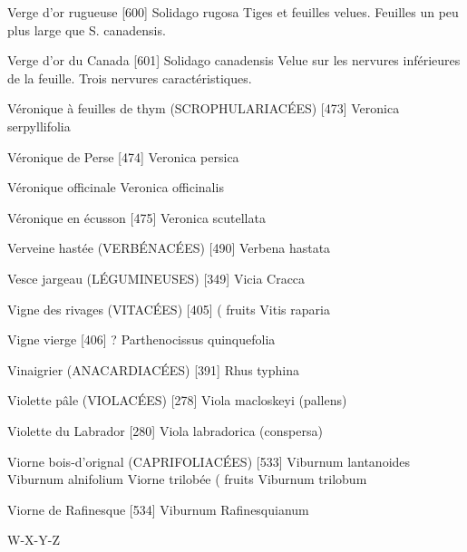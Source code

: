 \documentclass[book,12pt,a4paper,onecolumn,openany]{memoir}
\begin{document}
Verge d’or rugueuse  [600]
				Solidago rugosa
Tiges et feuilles velues. Feuilles un peu plus large que S. canadensis.

Verge d’or du Canada  [601]
				Solidago canadensis
Velue sur les nervures inférieures de la feuille. Trois nervures caractéristiques.

Véronique à feuilles de thym (SCROPHULARIACÉES)  [473]
				Veronica serpyllifolia

Véronique de Perse  [474]
				Veronica persica

Véronique officinale
				Veronica officinalis

Véronique en écusson  [475]
				Veronica scutellata


Verveine hastée (VERBÉNACÉES)  [490]
				Verbena hastata

Vesce jargeau (LÉGUMINEUSES)  [349]
				Vicia Cracca

Vigne des rivages (VITACÉES)  [405]				( fruits
				Vitis raparia

Vigne vierge  [406]							?
				Parthenocissus quinquefolia

Vinaigrier (ANACARDIACÉES)  [391]
				Rhus typhina

Violette pâle (VIOLACÉES)  [278]
				Viola macloskeyi (pallens)

Violette du Labrador  [280]
				Viola labradorica (conspersa)

Viorne bois-d’orignal (CAPRIFOLIACÉES)  [533]
				Viburnum lantanoides
				Viburnum alnifolium
Viorne trilobée							( fruits
				Viburnum trilobum

Viorne de Rafinesque  [534]
				Viburnum Rafinesquianum

W-X-Y-Z


	
\end{document}
